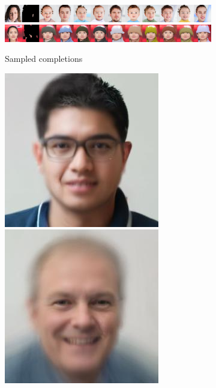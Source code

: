 \begin{figure}[t]
\begin{subfigure}[t]{0.73\textwidth}
    \includegraphics[trim=512px 0px 0px 0px, clip, height=\cmgfailureimgheight]{figs/cigcvae/co_mod_gan_failure/co_mod_gan_1_4_2.jpg}
    \includegraphics[trim=512px 0px 0px 0px, clip, height=\cmgfailureimgheight]{figs/cigcvae/co_mod_gan_failure/co_mod_gan_56_4_12.jpg}
    \caption{Sampled completions}
  \end{subfigure}
  \begin{subfigure}[t]{0.1\textwidth}
    \centering
    \includegraphics[height=\cmgfailureimgheight]{figs/cigcvae/co_mod_gan_failure/avg_co_mod_gan_0_3_2.jpg}
    \includegraphics[height=\cmgfailureimgheight]{figs/cigcvae/co_mod_gan_failure/avg_co_mod_gan_0_4_2.jpg}

\end{subfigure}
\end{figure}
